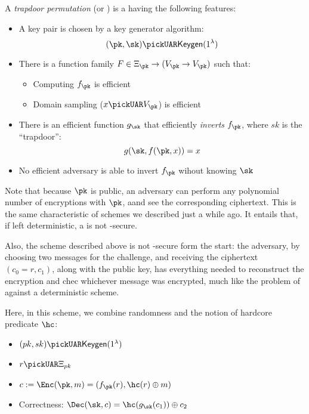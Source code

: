 A \emph{trapdoor permutation} (or \tdp) is a \owp{} having the following features:

\begin{itemize}
    \item A key pair is chosen \uar{} by a key generator algorithm:
    \[
        (\pk, \sk) \pickUAR \keygen(1^\lambda)
    \]
    \item There is a function family $F \in \Xi_\pk \to (V_{\pk} \to V_{\pk})$ such that:
    \begin{itemize}
        \item Computing $f_{\pk}$ is efficient
        \item Domain sampling ($x \pickUAR V_{\pk}$) is efficient
    \end{itemize}
    \item There is an efficient function $g_{\sk}$ that efficiently \emph{inverts} $f_{\pk}$, where $sk$ is the ``trapdoor'': 
    \[
        g(\sk, f(\pk, x)) = x
    \]
    \item No efficient adversary is able to invert $f_{\pk}$ wihout knowing $\sk$
\end{itemize}

Note that because $\pk$ is public, an adversary can perform any polynomial number of encryptions with $\pk$, aand see the corresponding ciphertext. This is the same characteristic of \pke{} schemes we described just a while ago. It entails that, if left deterministic, a \tdp{} is not \cpa-secure.

Also, the scheme described above is not \cpa-secure form the start: the adversary, by choosing two messages for the challenge, and receiving the ciphertext $(c_0 = r, c_1)$, along with the public key, has everything needed to reconstruct the encryption and chec whichever message was encrypted, much like the problem of \ufcma against a deterministic \mac scheme.

Here, in this scheme, we combine randomness and the notion of hardcore predicate $\hc$:

\begin{itemize}
    \item $(pk, sk) \pickUAR \keygen(1^\lambda)$
    \item $r \pickUAR \Xi_{pk}$
    \item $c := \Enc(\pk, m) = (f_{\pk}(r), \hc(r) \oplus m)$
    \item Correctness: $\Dec(\sk, c) = \hc(g_{\sk}(c_1)) \oplus c_2$
\end{itemize}

